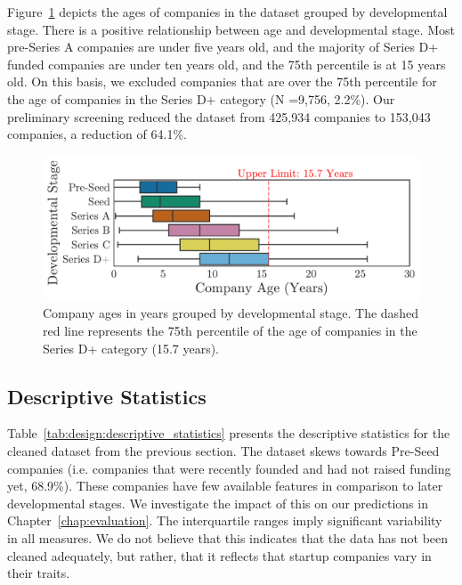 \documentclass[../thesis/thesis.tex]{subfiles}
\begin{document}
Figure~\ref{fig:design:stages_ages} depicts the ages of companies in the dataset grouped by developmental stage. There is a positive relationship between age and developmental stage. Most pre-Series A companies are under five years old, and the majority of Series D+ funded companies are under ten years old, and the 75th percentile is at 15 years old. On this basis, we excluded companies that are over the 75th percentile for the age of companies in the Series D+ category (N =9,756, 2.2\%). Our preliminary screening reduced the dataset from 425,934 companies to 153,043 companies, a reduction of 64.1\%.

\begin{figure}[!htb]
    \centering
    \includegraphics[width=\textwidth]{../figures/design/descriptives_ages_stage}
    \caption[Company ages by developmental stage]{Company ages in years grouped by developmental stage. The dashed red line represents the 75th percentile of the age of companies in the Series D+ category (15.7 years).}
    \label{fig:design:stages_ages}
\end{figure}

\subsection{Descriptive Statistics}

Table~\ref{tab:design:descriptive_statistics} presents the descriptive statistics for the cleaned dataset from the previous section. The dataset skews towards Pre-Seed companies (i.e. companies that were recently founded and had not raised funding yet, 68.9\%). These companies have few available features in comparison to later developmental stages. We investigate the impact of this on our predictions in Chapter~\ref{chap:evaluation}. The interquartile ranges imply significant variability in all measures. We do not believe that this indicates that the data has not been cleaned adequately, but rather, that it reflects that startup companies vary in their traits.
\end{document}
